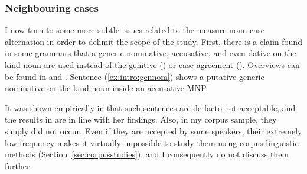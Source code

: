 \subsubsection{Neighbouring cases}
\label{sec:neighbouringcases}

% 
%

I now turn to some more subtle issues related to the measure noun case alternation in order to delimit the scope of the study.
First, there is a claim found in some grammars that a generic nominative, accusative, and even dative on the kind noun are used instead of the genitive (\PGCa) or case agreement (\NACa).
Overviews can be found in \cite{Hentschel1993} and \cite{Zimmer2015}.
Sentence (\ref{ex:intro:gennom}) shows a putative generic nominative on the kind noun inside an accusative MNP.

\begin{exe}
\end{exe}

It was shown empirically in \cite{Hentschel1993} that such sentences are de facto not acceptable, and the results in \citet{Zimmer2015} are in line with her findings.
Also, in my corpus sample, they simply did not occur.
Even if they are accepted by some speakers, their extremely low frequency makes it virtually impossible to study them using corpus linguistic methods (Section~\ref{sec:corpusstudies}), and I consequently do not discuss them further.

